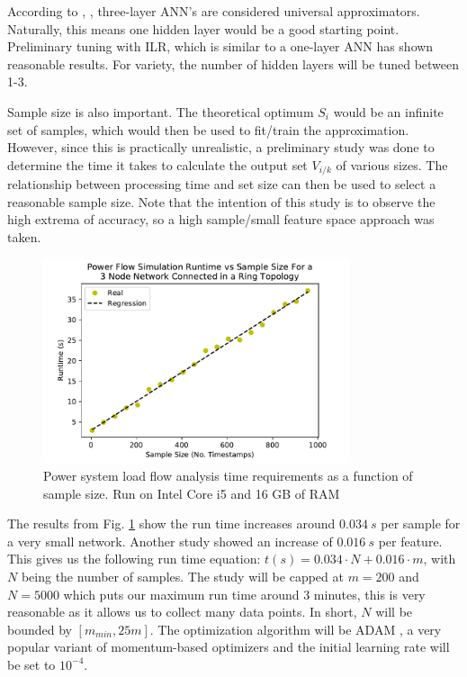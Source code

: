 \documentclass[conference]{IEEEtran}
\begin{document}
According to \cite{chen1994}, \cite{du2014}, three-layer ANN's are considered universal approximators. Naturally, this means one hidden layer would be a good starting point. Preliminary tuning with ILR, which is similar to a one-layer ANN has shown reasonable results. For variety, the number of hidden layers will be tuned between 1-3. 

Sample size is also important. The theoretical optimum $S_{i}$ would be an infinite set of samples, which would then be used to fit/train the approximation. However, since this is practically unrealistic, a preliminary study was done to determine the time it takes to calculate the output set $V_{i/k}$ of various sizes. The relationship between processing time and set size can then be used to select a reasonable sample size. Note that the intention of this study is to observe the high extrema of accuracy, so a high sample/small feature space approach was taken.

\begin{figure}[h]
	\centering
	\includegraphics[width=9cm]{pslfruntimevssamples.pdf}
	\caption{Power system load flow analysis time requirements as a function of sample size. Run on Intel Core i5 and 16 GB of RAM}
	\label{fig:pslfruntime}
\end{figure}

The results from Fig. \ref{fig:pslfruntime} show the run time increases around $0.034~s$ per sample for a very small network. Another study showed an increase of $0.016~s$ per feature. This gives us the following run time equation: $t(s) = 0.034\cdot N + 0.016\cdot m$, with $N$ being the number of samples. The study will be capped at $m = 200$ and $N = 5000$ which puts our maximum run time around 3 minutes, this is very reasonable as it allows us to collect many data points. In short, $N$ will be bounded by $[m_{min}, 25m]$. The optimization algorithm will be ADAM \cite{died2015}, a very popular variant of momentum-based optimizers and the initial learning rate will be set to $10^{-4}$.
 
\end{document}
